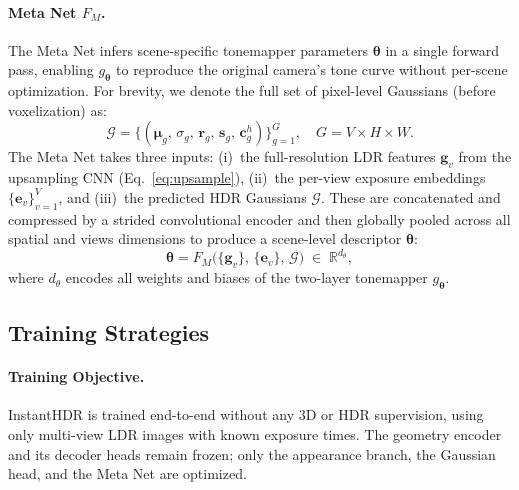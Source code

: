 \documentclass[runningheads]{llncs}
\begin{document}
\paragraph{\textbf{Meta Net $F_M$.}}
The Meta Net infers scene-specific tonemapper parameters $\boldsymbol{\theta}$ in a single forward pass, enabling $g_{\boldsymbol{\theta}}$ to reproduce the original camera's tone curve without per-scene optimization.
For brevity, we denote the full set of pixel-level Gaussians (before voxelization) as:
\begin{equation}
    \mathcal{G} = \bigl\{(\boldsymbol{\mu}_g,\, \sigma_g,\, \boldsymbol{r}_g,\, \boldsymbol{s}_g,\, \boldsymbol{c}_g^{h})\bigr\}_{g=1}^{G},
    \quad G = V \!\times\! H \!\times\! W.
\end{equation}
The Meta Net takes three inputs:
(i)~the full-resolution LDR features $\mathbf{g}_v$ from the upsampling CNN (Eq.~\eqref{eq:upsample}),
(ii)~the per-view exposure embeddings $\{\mathbf{e}_v\}_{v=1}^{V}$, and
(iii)~the predicted HDR Gaussians $\mathcal{G}$.
These are concatenated and compressed by a strided convolutional encoder and then globally pooled across all spatial and views dimensions to produce a scene-level descriptor $\boldsymbol{\theta}$:
\begin{equation}
    \boldsymbol{\theta}
    = F_M\!\bigl(\{\mathbf{g}_v\},\, \{\mathbf{e}_v\},\, \mathcal{G}\bigr)
    \;\in\; \mathbb{R}^{d_{\theta}},
\end{equation}
where $d_{\theta}$ encodes all weights and biases of the two-layer tonemapper $g_{\boldsymbol{\theta}}$.



\subsection{Training Strategies}
\label{sec:loss}

\paragraph{\textbf{Training Objective.}}
InstantHDR is trained end-to-end without any 3D or HDR supervision, using only multi-view LDR images with known exposure times.
The geometry encoder and its decoder heads remain frozen; only the appearance branch, the Gaussian head, and the Meta Net are optimized.
\end{document}

